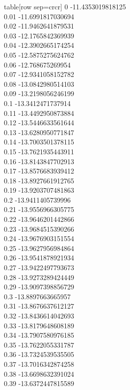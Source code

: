   table[row sep=crcr]{%
0	-11.4353019818125\\
0.01	-11.6991817030694\\
0.02	-11.9462641879531\\
0.03	-12.1765842369939\\
0.04	-12.3902665174254\\
0.05	-12.5875275624762\\
0.06	-12.768675269954\\
0.07	-12.9341058152782\\
0.08	-13.0842980514103\\
0.09	-13.2198056246199\\
0.1	-13.3412471737914\\
0.11	-13.4492950873884\\
0.12	-13.5446633561644\\
0.13	-13.6280950771847\\
0.14	-13.7003501378115\\
0.15	-13.7621935443911\\
0.16	-13.8143847702913\\
0.17	-13.8576683939412\\
0.18	-13.8927661912765\\
0.19	-13.9203707481863\\
0.2	-13.9411405739996\\
0.21	-13.9556966305775\\
0.22	-13.9646201442866\\
0.23	-13.9684515390266\\
0.24	-13.9676903151554\\
0.25	-13.9627956984864\\
0.26	-13.9541878921934\\
0.27	-13.9422497793673\\
0.28	-13.9273289424449\\
0.29	-13.9097398856729\\
0.3	-13.8897663665957\\
0.31	-13.8676637612127\\
0.32	-13.8436614042693\\
0.33	-13.8179648608189\\
0.34	-13.7907580976185\\
0.35	-13.7622055331787\\
0.36	-13.7324539535505\\
0.37	-13.7016342874258\\
0.38	-13.6698632391024\\
0.39	-13.6372447815589\\
}
